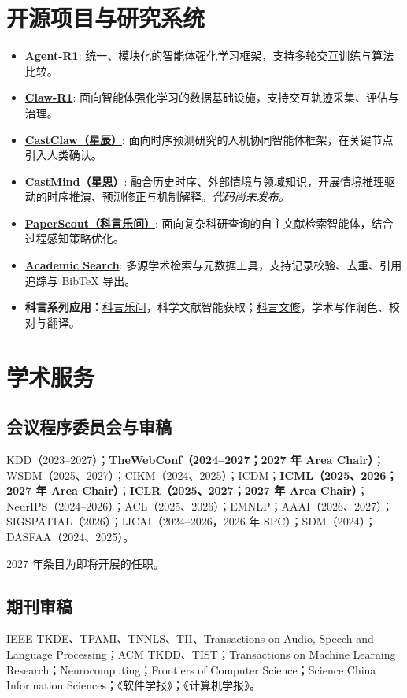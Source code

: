 \documentclass[UTF8,fontset=fandol,scheme=plain,11pt,a4paper]{ctexart}
\newcommand{\system}[3]{\item \textbf{\href{#2}{#1}}: #3}
\begin{document}
\section{开源项目与研究系统}
\begin{itemize}[itemsep=5pt]
\system{Agent-R1}{https://github.com/AgentR1/Agent-R1}{统一、模块化的智能体强化学习框架，支持多轮交互训练与算法比较。}
\system{Claw-R1}{https://github.com/AgentR1/Claw-R1}{面向智能体强化学习的数据基础设施，支持交互轨迹采集、评估与治理。}
\system{CastClaw（星辰）}{https://ustc-time-series.github.io/cast-claw/}{面向时序预测研究的人机协同智能体框架，在关键节点引入人类确认。}
\system{CastMind（星思）}{https://github.com/ustc-time-series/CastMind}{融合历史时序、外部情境与领域知识，开展情境推理驱动的时序推演、预测修正与机制解释。\textit{代码尚未发布。}}
\system{PaperScout（科言乐问）}{https://agentr1.github.io/paperscout/}{面向复杂科研查询的自主文献检索智能体，结合过程感知策略优化。}
\system{Academic Search}{https://github.com/ustc-ai4science/academic-search}{多源学术检索与元数据工具，支持记录校验、去重、引用追踪与 BibTeX 导出。}
\item \textbf{科言系列应用：}\href{https://lewen.bdaa.pro/}{科言乐问}，科学文献智能获取；\href{https://writelearn.bdaa.pro/}{科言文修}，学术写作润色、校对与翻译。
\end{itemize}

\section{学术服务}
\subsection{会议程序委员会与审稿}
KDD（2023--2027）；\textbf{TheWebConf（2024--2027；2027 年 Area Chair）}；WSDM（2025、2027）；CIKM（2024、2025）；ICDM；\textbf{ICML（2025、2026；2027 年 Area Chair）}；\textbf{ICLR（2025、2027；2027 年 Area Chair）}；NeurIPS（2024--2026）；ACL（2025、2026）；EMNLP；AAAI（2026、2027）；SIGSPATIAL（2026）；IJCAI（2024--2026，2026 年 SPC）；SDM（2024）；DASFAA（2024、2025）。

{\small\color{muted}2027 年条目为即将开展的任职。}
\subsection{期刊审稿}
IEEE TKDE、TPAMI、TNNLS、TII、Transactions on Audio, Speech and Language Processing；ACM TKDD、TIST；Transactions on Machine Learning Research；Neurocomputing；Frontiers of Computer Science；Science China Information Sciences；《软件学报》；《计算机学报》。
\end{document}
